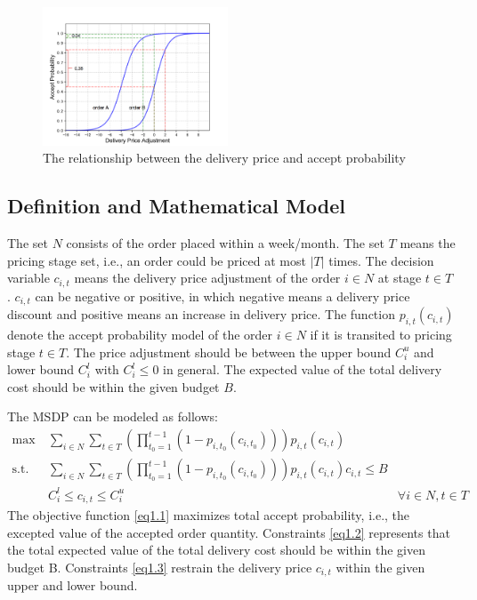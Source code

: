 \documentclass[sigconf,authordraft]{acmart}
\begin{document}
\begin{figure}[h]
  \centering
  \includegraphics[width=0.49\textwidth]{two orders.png}
  \caption{The relationship between the delivery price and accept probability}\label{fig:two orders}
\end{figure}

\subsection{Definition and Mathematical Model}
The set $N$ consists of the order placed within a week/month. The set $T$ means the pricing stage set, i.e., an order could be priced at most $|T|$ times. The decision variable $c_{i,t}$ means the delivery price adjustment of the order $i\in N$ at stage $t\in T$. $c_{i,t}$ can be negative or positive, in which negative means a delivery price discount and positive means an increase in delivery price. The function $p_{i,t}(c_{i,t})$ denote the accept probability model of the order $i\in N$ if it is transited to pricing stage $t\in T$. The price adjustment should be between the upper bound $C_i^u$ and lower bound $C_i^l$ with $C_i^l\le0$ in general. The expected value of the total delivery cost should be within the given budget $B$.

The MSDP can be modeled as follows:
\begin{align}
    \label{eq1.1}\max~& \sum_{i\in N}\sum_{t\in T}(\prod_{t_0=1}^{t-1} (1-p_{i,t_0}(c_{i,t_0})))p_{i,t}(c_{i,t}) \\
    \label{eq1.2}\mbox{s.t. }& \sum_{i\in N}\sum_{t\in T}(\prod_{t_0=1}^{t-1} (1-p_{i,t_0}(c_{i,t_0})))p_{i,t}(c_{i,t})c_{i,t}\le B\\
    \label{eq1.3}& C_i^l\le c_{i,t}\le C_i^u & \forall i \in N, t \in T
\end{align}
The objective function \eqref{eq1.1} maximizes total accept probability, i.e., the excepted value of the accepted order quantity. Constraints \eqref{eq1.2} represents that the total expected value of the total delivery cost should be within the given budget B. Constraints \eqref{eq1.3} restrain the delivery price $c_{i,t}$ within the given upper and lower bound.
\end{document}
